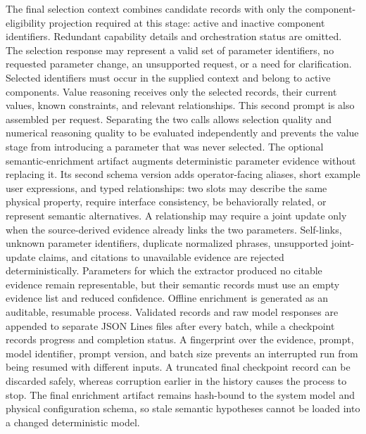 The final selection context combines candidate records with only the component-eligibility projection required at this stage: active and inactive component identifiers. Redundant capability details and orchestration status are omitted. The selection response may represent a valid set of parameter identifiers, no requested parameter change, an unsupported request, or a need for clarification. Selected identifiers must occur in the supplied context and belong to active components.
Value reasoning receives only the selected records, their current values, known constraints, and relevant relationships. This second prompt is also assembled per request. Separating the two calls allows selection quality and numerical reasoning quality to be evaluated independently and prevents the value stage from introducing a parameter that was never selected.
The optional semantic-enrichment artifact augments deterministic parameter evidence without replacing it. Its second schema version adds operator-facing aliases, short example user expressions, and typed relationships: two slots may describe the same physical property, require interface consistency, be behaviorally related, or represent semantic alternatives. A relationship may require a joint update only when the source-derived evidence already links the two parameters. Self-links, unknown parameter identifiers, duplicate normalized phrases, unsupported joint-update claims, and citations to unavailable evidence are rejected deterministically. Parameters for which the extractor produced no citable evidence remain representable, but their semantic records must use an empty evidence list and reduced confidence.
Offline enrichment is generated as an auditable, resumable process. Validated records and raw model responses are appended to separate JSON Lines files after every batch, while a checkpoint records progress and completion status. A fingerprint over the evidence, prompt, model identifier, prompt version, and batch size prevents an interrupted run from being resumed with different inputs. A truncated final checkpoint record can be discarded safely, whereas corruption earlier in the history causes the process to stop. The final enrichment artifact remains hash-bound to the system model and physical configuration schema, so stale semantic hypotheses cannot be loaded into a changed deterministic model.

